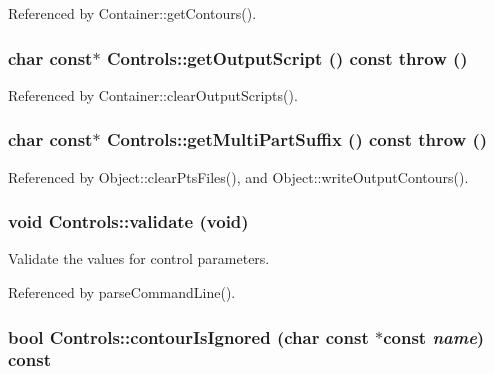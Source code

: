 Referenced by Container::getContours().\hypertarget{classControls_552dbe0a3a05ede218a2fc8b21ce8c3b}{
\subsubsection[getOutputScript]{\setlength{\rightskip}{0pt plus 5cm}char const$\ast$ Controls::getOutputScript () const  throw ()}}
\label{classControls_552dbe0a3a05ede218a2fc8b21ce8c3b}




Referenced by Container::clearOutputScripts().\hypertarget{classControls_acd1a231f7b7df8ed6341a0807221a55}{
\subsubsection[getMultiPartSuffix]{\setlength{\rightskip}{0pt plus 5cm}char const$\ast$ Controls::getMultiPartSuffix () const  throw ()}}
\label{classControls_acd1a231f7b7df8ed6341a0807221a55}




Referenced by Object::clearPtsFiles(), and Object::writeOutputContours().\hypertarget{classControls_b73d68f47510bc7098ebe4a636c613ce}{
\subsubsection[validate]{\setlength{\rightskip}{0pt plus 5cm}void Controls::validate (void)}}
\label{classControls_b73d68f47510bc7098ebe4a636c613ce}


Validate the values for control parameters. 

Referenced by parseCommandLine().\hypertarget{classControls_3ea8c4351e489235cb411d50798185b6}{
\subsubsection[contourIsIgnored]{\setlength{\rightskip}{0pt plus 5cm}bool Controls::contourIsIgnored (char const $\ast$const  {\em name}) const}}
\label{classControls_3ea8c4351e489235cb411d50798185b6}


